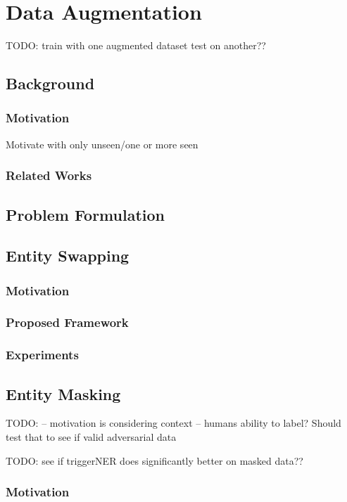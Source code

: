 \chapter{Data Augmentation}
TODO:
train with one augmented dataset test on another??

\section{Background}
\subsection{Motivation}
Motivate with only unseen/one or more seen

\subsection{Related Works}

\section{Problem Formulation}

\section{Entity Swapping}

\subsection{Motivation}

\subsection{Proposed Framework}

\subsection{Experiments}

\section{Entity Masking}
TODO:
-- motivation is considering context
-- humans ability to label? Should test that to see if valid adversarial data


TODO: see if triggerNER does significantly better on masked  data??

\subsection{Motivation}

